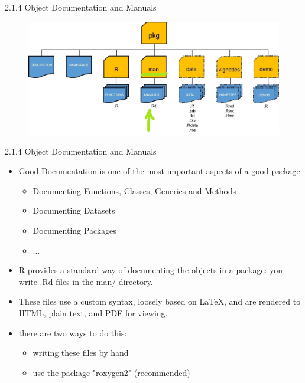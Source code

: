 \documentclass[11pt,a4paper]{beamer}
\begin{document}
\begin{frame}[t]{2.1.4 Object Documentation and Manuals}
	
	
	\begin{figure}
		\centering
		\includegraphics[width=0.9\linewidth]{Manu}
		\label{fig:packages}
	\end{figure}
	
	
\end{frame}






\begin{frame}[t]{2.1.4 Object Documentation and Manuals}
	
	\begin{itemize}
		\item  Good Documentation	is	one	of	the	most	important	aspects	of	a	good package
		\begin{itemize}
			\item Documenting	Functions, 	Classes,	Generics and	Methods
			\item Documenting	Datasets
			\item Documenting	Packages
			\item ...
		\end{itemize}
		
		\item R	provides	a	standard	way	of	documenting	the	objects	in	a	package:	you	write	.Rd	files	in 	the	man/ directory.	
		\item 	These	files	use	a	custom	syntax,	loosely	based	on	LaTeX,	and	are
		rendered	to	HTML,	plain	text,	and	PDF	for	viewing.
		\item there are two ways to do this:
		\begin{itemize}
			\item writing	these	files	by	hand 
			\item use the package "roxygen2" (recommended)
		\end{itemize}
		
		
	\end{itemize}
	
\end{frame}
\end{document}
